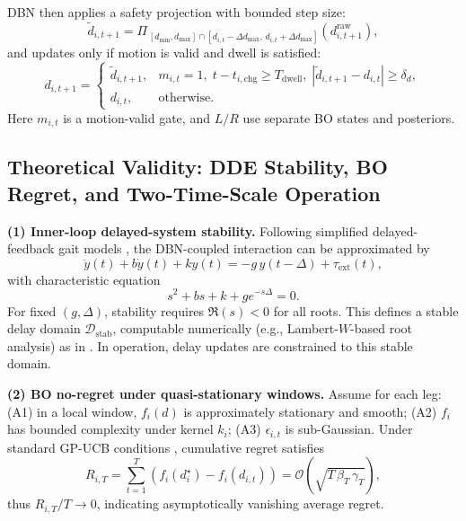 \documentclass[lettersize,journal]{IEEEtran}
\begin{document}
DBN then applies a safety projection with bounded step size:
\begin{equation}
\tilde d_{i,t+1}=
\Pi_{\,[d_{\min},d_{\max}]\cap[d_{i,t}-\Delta d_{\max},\,d_{i,t}+\Delta d_{\max}]}
\left(d_{i,t+1}^{\mathrm{raw}}\right),
\label{eq:projection}
\end{equation}
and updates only if motion is valid and dwell is satisfied:
\begin{equation}
d_{i,t+1}=
\begin{cases}
\tilde d_{i,t+1}, & m_{i,t}=1,\; t-t_{i,\mathrm{chg}}\ge T_{\mathrm{dwell}},\;
|\tilde d_{i,t+1}-d_{i,t}|\ge \delta_d,\\
d_{i,t}, & \text{otherwise}.
\end{cases}
\label{eq:update_rule}
\end{equation}
Here $m_{i,t}$ is a motion-valid gate, and $L/R$ use separate BO
states and posteriors.

\subsection{Theoretical Validity: DDE Stability, BO Regret, and Two-Time-Scale Operation}
\textbf{(1) Inner-loop delayed-system stability.}
Following simplified delayed-feedback gait models \cite{lim2019tro},
the DBN-coupled interaction can be approximated by
\begin{equation}
\ddot y(t)+b\dot y(t)+ky(t)=-g\,y(t-\Delta)+\tau_{\mathrm{ext}}(t),
\label{eq:dde_model}
\end{equation}
with characteristic equation
\begin{equation}
s^2+bs+k+g e^{-s\Delta}=0.
\label{eq:char_eq}
\end{equation}
For fixed $(g,\Delta)$, stability requires $\Re(s)<0$ for all roots.
This defines a stable delay domain $\mathcal{D}_{\mathrm{stab}}$, computable
numerically (e.g., Lambert-$W$-based root analysis) as in \cite{lim2019tro}.
In operation, delay updates are constrained to this stable domain.

\textbf{(2) BO no-regret under quasi-stationary windows.}
Assume for each leg: (A1) in a local window, $f_i(d)$ is approximately
stationary and smooth; (A2) $f_i$ has bounded complexity under kernel
$k_i$; (A3) $\epsilon_{i,t}$ is sub-Gaussian.
Under standard GP-UCB conditions \cite{srinivas2010gpucb},
cumulative regret satisfies
\begin{equation}
R_{i,T}=\sum_{t=1}^{T}\left(f_i(d_i^\star)-f_i(d_{i,t})\right)
=\mathcal{O}\!\left(\sqrt{T\,\beta_T\,\gamma_T}\right),
\label{eq:regret}
\end{equation}
thus $R_{i,T}/T\to 0$, indicating asymptotically vanishing average regret.
\end{document}
